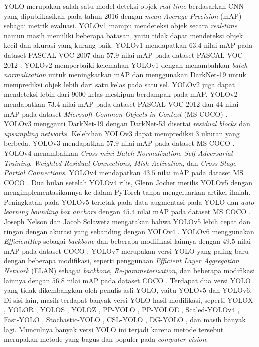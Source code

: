     YOLO merupakan salah satu model deteksi objek \textit{real-time} berdasarkan CNN yang dipublikasikan pada tahun 2016 dengan \textit{mean Average Precision} (mAP) sebagai metrik evaluasi. YOLOv1 mampu mendeteksi objek secara \textit{real-time} namun masih memiliki beberapa batasan, yaitu tidak dapat mendeteksi objek kecil dan akurasi yang kurang baik. YOLOv1 mendapatkan $63.4$ nilai mAP pada dataset PASCAL VOC 2007 dan $57.9$ nilai mAP pada dataset PASCAL VOC 2012 \citep{Redmon2016a}. YOLOv2 memperbaiki kelemahan YOLOv1 dengan menambahkan \textit{batch normalization} untuk meningkatkan mAP dan menggunakan DarkNet-19 untuk memprediksi objek lebih dari satu kelas pada satu sel. YOLOv2 juga dapat mendeteksi lebih dari 9000 kelas meskipun berdampak pada mAP. YOLOv2 mendapatkan $73.4$ nilai mAP pada dataset PASCAL VOC 2012 dan $44$ nilai mAP pada dataset \textit{Microsoft Common Objects in Context} (MS COCO) \citep{Redmon2017}. YOLOv3 mengganti DarkNet-19 dengan DarkNet-53 disertai \textit{residual blocks} dan \textit{upsampling networks}. Kelebihan YOLOv3 dapat memprediksi 3 ukuran yang berbeda. YOLOv3 mendapatkan $57.9$ nilai mAP pada dataset MS COCO \citep{Redmon2018}. YOLOv4 menambahkan \textit{Cross-mini Batch Normalization}, \textit{Self Adversarial Training}, \textit{Weighted Residual Connections}, \textit{Mish Activation}, dan \textit{Cross Stage Partial Connections}. YOLOv4 mendapatkan $43.5$ nilai mAP pada dataset MS COCO \citep{Bochkovskiy2020}. Dua bulan setelah YOLOv4 rilis, Glenn Jocher merilis YOLOv5 dengan mengimplementasikannya ke dalam PyTorch tanpa mengeluarkan artikel ilmiah. Peningkatan pada YOLOv5 terletak pada data augmentasi pada YOLO dan \textit{auto learning bounding box anchors} dengan $45.4$ nilai mAP pada dataset MS COCO \citep{Jocher2020}. Joseph Nelson dan Jacob Solawetz mengatakan bahwa YOLOv5 lebih cepat dan ringan dengan akurasi yang sebanding dengan YOLOv4 \citep{Nelson2020}. YOLOv6 menggunakan \textit{EfficientRep} sebagai \textit{backbone} dan beberapa modifikasi lainnya dengan $49.5$ nilai mAP pada dataset COCO \citep{Li2022}. YOLOv7 merupakan versi YOLO yang paling baru dengan beberapa modifikasi, seperti penggunaan \textit{Efficient Layer Aggregation Network} (ELAN) sebagai \textit{backbone}, \textit{Re-parameterization}, dan beberapa modifikasi lainnya dengan $56.8$ nilai mAP pada dataset COCO \citep{Wang2022}. Terdapat dua versi YOLO yang tidak dikembangkan oleh penulis asli YOLO, yaitu YOLOv5 dan YOLOv6. Di sisi lain, masih terdapat banyak versi YOLO hasil modifikasi, seperti YOLOX \citep{Ge2021}, YOLOR \citep{Wang}, YOLOS \citep{Fang2021b}, YOLOZ \citep{Benjumea}, PP-YOLO \citep{Long2020}, PP-YOLOE \citep{xu2022pp}, Scaled-YOLOv4 \citep{Wanga}, Fast-YOLO \citep{shafiee2017fast}, Stochastic-YOLO \cite{azevedo2020stochastic}, CSL-YOLO \citep{zhang2021csl}, DG-YOLO \citep{liu2020wqt}, dan masih banyak lagi. Munculnya banyak versi YOLO ini terjadi karena metode tersebut merupakan metode yang bagus dan populer pada \textit{computer vision}.

